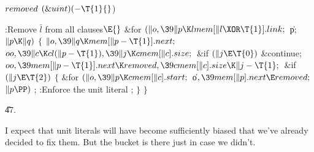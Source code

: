 \Y\B\4\D$\\{removed}$ \5
$(\&{uint})({-}\T{1}{}$)\par
\Y\B\4:Remove $\bar l$ from all clauses\X${}\E{}$\6
\&{for} ${}(\|o,\39\|p\K\\{lmem}[\|l\XOR\T{1}].\\{link};{}$ \|p; ${}\|p\K%
\|q){}$\5
${}\{{}$\1\6
${}\|o,\39\|q\K\\{mem}[\|p-\T{1}].\\{next};{}$\6
${}\\{oo},\39\|c\K\\{cl}(\|p-\T{1}),\39\|j\K\\{cmem}[\|c].\\{size};{}$\6
\&{if} ${}(\|j\E\T{0}){}$\1\5
\&{continue};\2\6
${}\\{oo},\39\\{mem}[\|p-\T{1}].\\{next}\K\\{removed},\39\\{cmem}[\|c].\\{size}%
\K\|j-\T{1};{}$\6
\&{if} ${}(\|j\E\T{2}){}$\5
${}\{{}$\1\6
\&{for} ${}(\|o,\39\|p\K\\{cmem}[\|c].\\{start};{}$ \|o${},\39\\{mem}[\|p].%
\\{next}\E\\{removed};{}$ ${}\|p\PP){}$\1\5
;\2\6
:Enforce the unit literal \X;\6
\4${}\}{}$\2\6
\4${}\}{}$\2\par
\U47.\fi

I expect that unit literals will have become sufficiently
biased that
we've already decided to fix them. But the  bucket is there just
in case we didn't.

